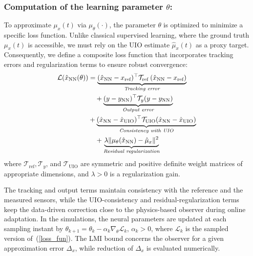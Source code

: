 \documentclass{ifacconf}
\def\eqref#1{(\ref{#1})}
\def\nn{\mathrm{NN}}
\def\uio{\mathrm{UIO}}
\def\refx{\mathrm{ref}}
\begin{document}
\subsubsection{Computation of the learning parameter $\theta$:}
%
To approximate $\mu_{x}(t)$ via $\mu_{\theta}(\cdot)$, the parameter $\theta$ is optimized to minimize a specific loss function. Unlike classical supervised learning, where the ground truth $\mu_{x}(t)$ is accessible, we must rely on the UIO estimate $\hat{\mu}_{x}(t)$ as a proxy target. Consequently, we define a composite loss function that incorporates tracking errors and regularization terms to ensure robust convergence:
{
\begin{align}\label{loss_fun}
\mathcal{L}(\hat{x}_{\nn}(\theta)) &= \underbrace{(\hat{x}_{\nn} - x_{\text{ref}})^{\top} \mathcal{T}_{\refx}\,(\hat{x}_{\nn} - x_{\text{ref}})}_{\textit{Tracking error}} \notag \\
&\quad+ 
\underbrace{(y - y_{\nn})^{\top} \mathcal{T}_{y} (y - y_{\nn})}_{\textit{Output error}} \notag \\
&+ \underbrace{(\hat{x}_{\nn} - \hat{x}_{\uio})^{\top} \mathcal{T}_{\uio} (\hat{x}_{\nn} - \hat{x}_{\uio})}_{\textit{Consistency with UIO}} \notag \\
&\quad+ 
\underbrace{\lambda \| \mu_{\theta}(\hat{x}_{\nn}) - \hat{\mu}_{x} \|^2}_{\textit{Residual regularization}}   
\end{align}
}
where $\mathcal{T}_{\refx}, \mathcal{T}_{y}$, and $\mathcal{T}_{\uio}$ are symmetric and positive definite weight matrices of appropriate dimensions, and $\lambda > 0$ is a regularization gain.

The tracking and output terms maintain consistency with the reference and the measured sensors, while the UIO-consistency and residual-regularization terms keep the data-driven correction close to the physics-based observer during online adaptation. In the simulations, the neural parameters are updated at each sampling instant by $\theta_{k+1}=\theta_k-\alpha_k\nabla_\theta\mathcal{L}_k$, $\alpha_k>0$, where $\mathcal{L}_k$ is the sampled version of~\eqref{loss_fun}. The LMI bound concerns the observer for a given approximation error $\Delta_x$, while reduction of $\Delta_x$ is evaluated numerically.




\end{document}
